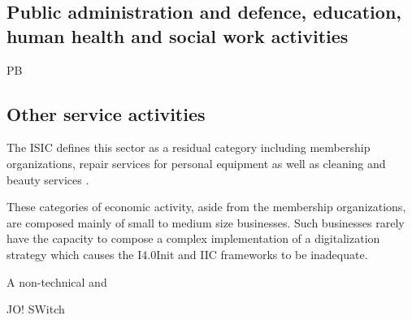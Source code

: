 \subsection{Public administration and defence, education, human health and social work activities}
PB

\subsection{Other service activities}
The \ac{ISIC} defines this sector as a residual category including membership organizations, repair services for personal equipment as well as cleaning and beauty services \cite[p.262ff.]{ISIC:2008}. 

These categories of economic activity, aside from the membership organizations, are composed mainly of small to medium size businesses. Such businesses rarely have the capacity to compose a complex implementation of a digitalization strategy which causes the \ac{I4.0Init} and \ac{IIC} frameworks to be inadequate. 

A non-technical and 

JO! SWitch